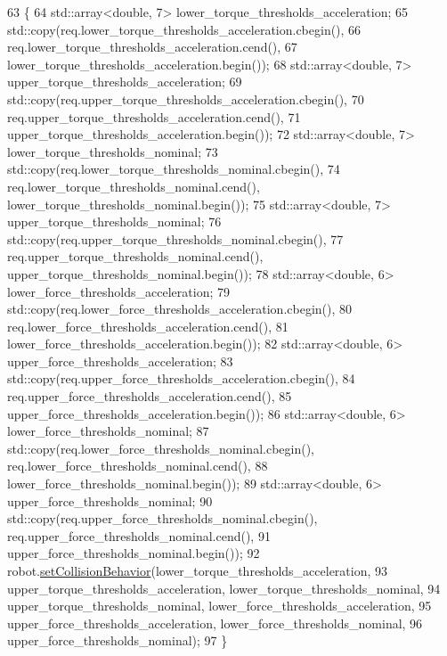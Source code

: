 \begin{DoxyCode}
63                                                                    \{
64   std::array<double, 7> lower\_torque\_thresholds\_acceleration;
65   std::copy(req.lower\_torque\_thresholds\_acceleration.cbegin(),
66             req.lower\_torque\_thresholds\_acceleration.cend(),
67             lower\_torque\_thresholds\_acceleration.begin());
68   std::array<double, 7> upper\_torque\_thresholds\_acceleration;
69   std::copy(req.upper\_torque\_thresholds\_acceleration.cbegin(),
70             req.upper\_torque\_thresholds\_acceleration.cend(),
71             upper\_torque\_thresholds\_acceleration.begin());
72   std::array<double, 7> lower\_torque\_thresholds\_nominal;
73   std::copy(req.lower\_torque\_thresholds\_nominal.cbegin(),
74             req.lower\_torque\_thresholds\_nominal.cend(), lower\_torque\_thresholds\_nominal.begin());
75   std::array<double, 7> upper\_torque\_thresholds\_nominal;
76   std::copy(req.upper\_torque\_thresholds\_nominal.cbegin(),
77             req.upper\_torque\_thresholds\_nominal.cend(), upper\_torque\_thresholds\_nominal.begin());
78   std::array<double, 6> lower\_force\_thresholds\_acceleration;
79   std::copy(req.lower\_force\_thresholds\_acceleration.cbegin(),
80             req.lower\_force\_thresholds\_acceleration.cend(),
81             lower\_force\_thresholds\_acceleration.begin());
82   std::array<double, 6> upper\_force\_thresholds\_acceleration;
83   std::copy(req.upper\_force\_thresholds\_acceleration.cbegin(),
84             req.upper\_force\_thresholds\_acceleration.cend(),
85             upper\_force\_thresholds\_acceleration.begin());
86   std::array<double, 6> lower\_force\_thresholds\_nominal;
87   std::copy(req.lower\_force\_thresholds\_nominal.cbegin(), req.lower\_force\_thresholds\_nominal.cend(),
88             lower\_force\_thresholds\_nominal.begin());
89   std::array<double, 6> upper\_force\_thresholds\_nominal;
90   std::copy(req.upper\_force\_thresholds\_nominal.cbegin(), req.upper\_force\_thresholds\_nominal.cend(),
91             upper\_force\_thresholds\_nominal.begin());
92   robot.\hyperlink{classfranka_1_1Robot_a168e1214ac36d74ac64f894332b84534}{setCollisionBehavior}(lower\_torque\_thresholds\_acceleration,
93                              upper\_torque\_thresholds\_acceleration, lower\_torque\_thresholds\_nominal,
94                              upper\_torque\_thresholds\_nominal, lower\_force\_thresholds\_acceleration,
95                              upper\_force\_thresholds\_acceleration, lower\_force\_thresholds\_nominal,
96                              upper\_force\_thresholds\_nominal);
97 \}
\end{DoxyCode}
